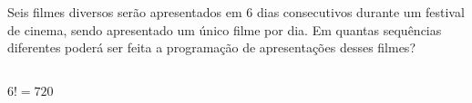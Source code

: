 \begin{ex}
Seis filmes diversos serão apresentados em 6 dias consecutivos durante um festival de cinema, sendo apresentado um único filme por dia. Em quantas sequências diferentes poderá ser feita a programação de apresentações desses filmes?
  \begin{sol}
  \phantom{A} \\
  $6!=720$
  \end{sol}
\end{ex}